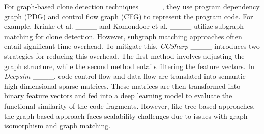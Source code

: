 For graph-based clone detection techniques ____, they use program dependency graph (PDG) and control flow graph (CFG) to represent the program code. 
For example, Krinke et al. ____ and Komondoor et al. ____ utilize subgraph matching for clone detection. 
However, subgraph matching approaches often entail significant time overhead. 
To mitigate this, \emph{CCSharp} ____ introduces two strategies for reducing this overhead. 
The first method involves adjusting the graph structure, while the second method entails filtering the feature vectors. 
In \emph{Deepsim} ____, code control flow and data flow are translated into semantic high-dimensional sparse matrices. These matrices are then transformed into binary feature vectors and fed into a deep learning model to evaluate the functional similarity of the code fragments.
However, like tree-based approaches, the graph-based approach faces scalability challenges due to issues with graph isomorphism and graph matching.


